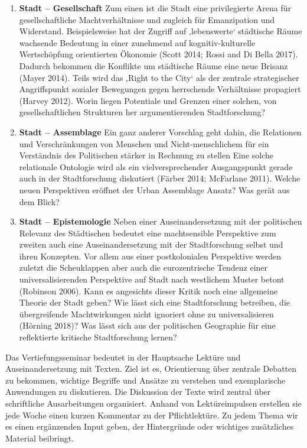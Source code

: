 \documentclass[
]{article}
\begin{document}
\begin{enumerate}
\def\labelenumi{\arabic{enumi}.}
\item
  \textbf{Stadt -- Gesellschaft} Zum einen ist die Stadt eine privilegierte Arena für gesellschaftliche Machtverhältnisse und zugleich für Emanzipation und Widerstand. Beispielsweise hat der Zugriff auf ‚lebenswerte` städtische Räume wachsende Bedeutung in einer zunehmend auf kognitiv-kulturelle Wertschöpfung orientierten Ökonomie (Scott 2014; Rossi and Di Bella 2017). Dadurch bekommen die Konflikte um städtische Räume eine neue Brisanz (Mayer 2014). Teils wird das ‚Right to the City` als der zentrale strategischer Angriffspunkt sozialer Bewegungen gegen herrschende Verhältnisse propagiert (Harvey 2012). Worin liegen Potentiale und Grenzen einer solchen, von gesellschaftlichen Strukturen her argumentierenden Stadtforschung?
\item
  \textbf{Stadt -- Assemblage} Ein ganz anderer Vorschlag geht dahin, die Relationen und Verschränkungen von Menschen und Nicht-menschlichem für ein Verständnis des Politischen stärker in Rechnung zu stellen Eine solche relationale Ontologie wird als ein vielversprechender Ausgangspunkt gerade auch in der Stadtforschung diskutiert (Färber 2014; McFarlane 2011). Welche neuen Perspektiven eröffnet der Urban Assemblage Ansatz? Was gerät aus dem Blick?
\item
  \textbf{Stadt -- Epistemologie} Neben einer Auseinandersetzung mit der politischen Relevanz des Städtischen bedeutet eine machtsensible Perspektive zum zweiten auch eine Auseinandersetzung mit der Stadtforschung selbst und ihren Konzepten. Vor allem aus einer postkolonialen Perspektive werden zuletzt die Scheuklappen aber auch die eurozentrische Tendenz einer universalisierenden Perspektive auf Stadt nach westlichem Muster betont (Robinson 2006). Kann es angesichts dieser Kritik noch eine allgemeine Theorie der Stadt geben? Wie lässt sich eine Stadtforschung betreiben, die übergreifende Machtwirkungen nicht ignoriert ohne zu universalisieren (Hörning 2018)? Was lässt sich aus der politischen Geographie für eine reflektierte kritische Stadtforschung lernen?
\end{enumerate}

Das Vertiefungsseminar bedeutet in der Hauptsache Lektüre und Auseinandersetzung mit Texten. Ziel ist es, Orientierung über zentrale Debatten zu bekommen, wichtige Begriffe und Ansätze zu verstehen und exemplarische Anwendungen zu diskutieren. Die Diskussion der Texte wird zentral über schriftliche Ausarbeitungen organisiert. Anhand von Lektüreimpulsen erstellen sie jede Woche einen kurzen Kommentar zu der Pflichtlektüre. Zu jedem Thema wir es einen ergänzenden Input geben, der Hintergründe oder wichtiges zusätzliches Material beibringt.
\end{document}
